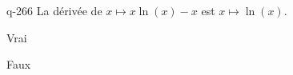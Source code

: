 \begin{truefalse}{q-266}
La dérivée de $x\mapsto x\ln(x)-x$ est $x\mapsto \ln(x)$.
\item* Vrai
\item Faux
\end{truefalse}

